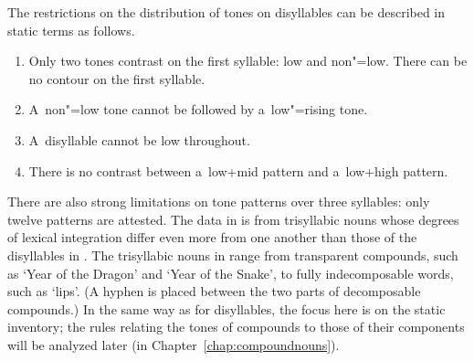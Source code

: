 The restrictions on the distribution of tones on disyllables can be described in static terms as follows. 
\begin{enumerate}[label=(\roman*), itemsep=0pt]
\item Only two tones contrast on the first syllable: low and non"=low. There can be no contour on the first syllable. 
\item A~non"=low tone cannot be followed by a~low"=rising tone.
\item A~disyllable cannot be low throughout. 
\item There is no contrast between a~low+mid pattern and a~low+high pattern. 
\end{enumerate}

There are also strong limitations on tone patterns over three syllables: only twelve patterns are attested. The data in  is from trisyllabic nouns whose degrees of lexical integration differ even more from one another than those of the disyllables in . The trisyllabic nouns in  range from transparent compounds, such as ‘Year of the Dragon’ and ‘Year of the Snake’, to fully indecomposable words, such as ‘lips’. (A hyphen is placed between the two parts of decomposable compounds.) In the same way as for disyllables, the focus here is on the static inventory; the rules relating the tones of compounds to those of their components will be analyzed later (in Chapter~\ref{chap:compoundnouns}).

